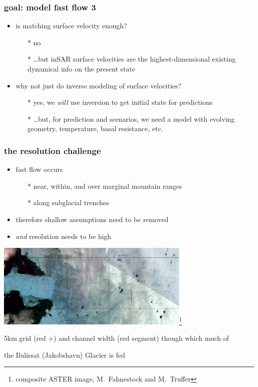 \documentclass{beamer}
\begin{document}
\begin{frame}
  \frametitle{goal: model fast flow 3}

\begin{itemize}
\item is matching surface velocity enough?
  \begin{itemize}
  \item[*] no
  \item[*] \dots but inSAR surface velocities are the highest-dimensional existing dynamical info on the present state
  \end{itemize}
\item why not just do inverse modeling of surface velocities?
  \begin{itemize}
    \item[*] yes, we \emph{will} use inversion to get initial state for predictions
    \item[*] \dots but, for prediction and scenarios, we need a model with evolving geometry, temperature, basal resistance, etc.
  \end{itemize}

\end{itemize} 
\end{frame}


\begin{frame}
  \frametitle{the resolution challenge}

\vspace{-0.1in}

\small
\begin{itemize}
\item fast flow occurs
  \begin{itemize}
  \item[*] near, within, and over marginal mountain ranges
  \item[*] along subglacial trenches
  \end{itemize}
\item therefore shallow assumptions need to be removed
\item \emph{and} resolution needs to be high
\end{itemize} 

\begin{center}
  \includegraphics[width=0.7\textwidth]{jacob_5km_grid}\footnote{\tiny composite ASTER image, M.~Fahnestock and M.~Truffer}

\scriptsize  5km grid (\alert{red $+$}) and channel width (\alert{red segment}) though which much of

the Ilulissat (Jakobshavn) Glacier is fed
\end{center}
\end{frame}
\end{document}
